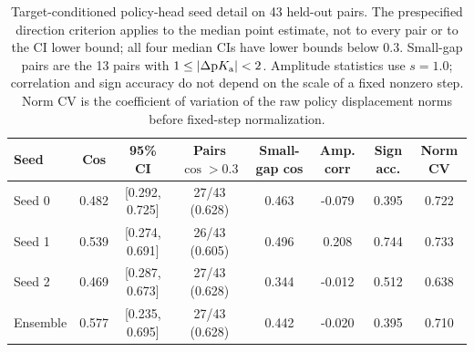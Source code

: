 \begin{table}[h]
\centering
\caption{Target-conditioned policy-head seed detail on 43 held-out pairs. The prespecified direction criterion applies to the median point estimate, not to every pair or to the CI lower bound; all four median CIs have lower bounds below $0.3$. Small-gap pairs are the 13 pairs with $1\leq|\Delta\mathrm{p}K_{\mathrm a}|<2$. Amplitude statistics use $s=1.0$; correlation and sign accuracy do not depend on the scale of a fixed nonzero step. Norm CV is the coefficient of variation of the raw policy displacement norms before fixed-step normalization.}
\label{tab:policy_seeds}
\scriptsize
\begin{tabular}{lccccccc}
\toprule
Seed & Cos & 95\% CI & Pairs $\cos>0.3$ & Small-gap cos & Amp. corr & Sign acc. & Norm CV \\
\midrule
Seed 0 & 0.482 & [0.292, 0.725] & 27/43 (0.628) & 0.463 & -0.079 & 0.395 & 0.722 \\
Seed 1 & 0.539 & [0.274, 0.691] & 26/43 (0.605) & 0.496 & 0.208 & 0.744 & 0.733 \\
Seed 2 & 0.469 & [0.287, 0.673] & 27/43 (0.628) & 0.344 & -0.012 & 0.512 & 0.638 \\
Ensemble & 0.577 & [0.235, 0.695] & 27/43 (0.628) & 0.442 & -0.020 & 0.395 & 0.710 \\
\bottomrule
\end{tabular}
\end{table}
